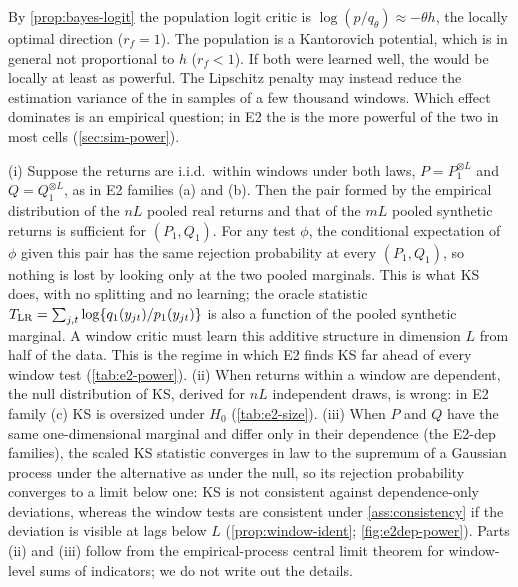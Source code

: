 \begin{remark}\label{rem:lr-vs-w1}
By \cref{prop:bayes-logit} the population logit critic is $\log(p/q_\theta)\approx-\theta h$, the
locally optimal direction ($r_f=1$). The population \WC{} is a Kantorovich potential, which is in
general not proportional to $h$ ($r_f<1$). If both were learned well, the \LRC{} would be locally
at least as powerful. The Lipschitz penalty may instead reduce the estimation variance of the
\WC{} in samples of a few thousand windows. Which effect dominates is an empirical question; in
E2 the \WC{} is the more powerful of the two in most cells (\cref{sec:sim-power}).
\end{remark}

\begin{remark}\label{rem:ks-marginal}
(i) Suppose the returns are i.i.d.\ within windows under both laws, $P=P_1^{\otimes L}$ and
$Q=Q_1^{\otimes L}$, as in E2 families (a) and (b). Then the pair formed by the empirical
distribution of the $nL$ pooled real returns and that of the $mL$ pooled synthetic returns is
sufficient for $(P_1,Q_1)$. For any test $\phi$, the conditional expectation of $\phi$ given this
pair has the same rejection probability at every $(P_1,Q_1)$, so nothing is lost by looking only
at the two pooled marginals. This is what KS does, with no splitting and no learning; the oracle
statistic $T_{\mathrm{LR}}=\sum_{j,t}\log\{q_1(y_{jt})/p_1(y_{jt})\}$ is also a function of the pooled
synthetic marginal. A window critic must learn this additive structure in dimension $L$ from half
of the data. This is the regime in which E2 finds KS far ahead of every window test
(\cref{tab:e2-power}).
(ii) When returns within a window are dependent, the null distribution of KS, derived for $nL$
independent draws, is wrong: in E2 family (c) KS is oversized under $H_0$ (\cref{tab:e2-size}).
(iii) When $P$ and $Q$ have the same one-dimensional marginal and differ only in their dependence
(the E2-dep families), the scaled KS statistic converges in law to the supremum of a Gaussian
process under the alternative as under the null, so its rejection probability converges to a
limit below one: KS is not consistent against dependence-only deviations, whereas the window tests
are consistent under \cref{ass:consistency} if the deviation is visible at lags below $L$
(\cref{prop:window-ident}; \cref{fig:e2dep-power}). Parts (ii) and (iii) follow from the
empirical-process central limit theorem for window-level sums of indicators; we do not write out
the details.
\end{remark}

